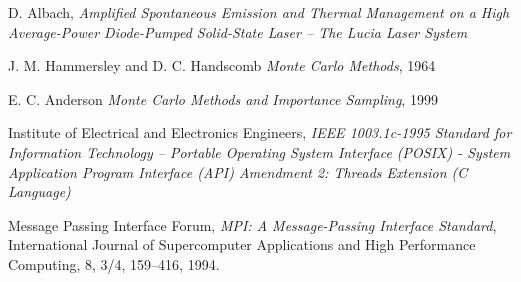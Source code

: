 \begin{thebibliography}{9}


    D. Albach,
    \emph{Amplified Spontaneous Emission and Thermal Management on a High Average-Power Diode-Pumped Solid-State Laser \--- The Lucia Laser System}

    J. M. Hammersley and D. C. Handscomb
    \emph{Monte Carlo Methods},
    1964

    E. C. Anderson
    \emph{Monte Carlo Methods and Importance Sampling},
    1999


    Institute of Electrical and Electronics Engineers,
    \emph{IEEE 1003.1c-1995 Standard for Information Technology \---
    Portable Operating System Interface (POSIX) \-- System Application Program Interface (API) Amendment 2: Threads Extension (C Language)}

    Message Passing Interface Forum,
    \emph{MPI: A Message-Passing Interface Standard}, 
    International Journal of Supercomputer Applications and High Performance Computing,
    8, 3/4, 159–416, 1994.

\end{thebibliography}
